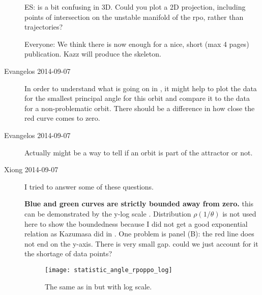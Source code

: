 \begin{description}
ES: {\PoincSec} is a bit confusing in 3D. Could you plot a 2D
projection, including points of intersection on the unstable manifold
of the rpo, rather than trajectories?

Everyone: We think there is now enough for a nice, short (max 4 pages) publication.
Kazz will produce the skeleton.

\item[Evangelos 2014-09-07] In order to understand what is going
on in ,
it might help to plot the data for the smallest principal angle for this orbit
and compare it to the data for a non-problematic orbit. There should be a difference
in how close the red curve comes to zero.

\item[Evangelos 2014-09-07] Actually  might be
a way to tell if an orbit is part of the attractor or not.

\item[Xiong 2014-09-07] I tried to answer some of these questions.

\textbf{Blue and green curves are strictly bounded away from zero.}
this can be demonstrated by the y-log scale
. Distribution $\rho(1/\theta)$
is not used here to show the boundedness because I did not get a good
exponential relation as
Kazumasa did in . One problem is panel (B):
the red line does not end on the y-axis. There is very small
gap. could we just account for it the shortage of data points?

\begin{figure}[h]
  \centering
  \texttt{[image: statistic\_angle\_rpoppo\_log]}
  \caption{
  The same as in  but with log scale.}
  \label{fig:statistic_angle_rpoppo_log}
\end{figure}



\end{description}

